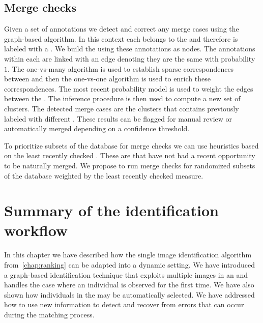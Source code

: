     \subsection{Merge checks}
        Given a set of annotations we detect and correct any merge cases using
          the graph-based algorithm.
        In this context each \annot{} belongs to the \masterdatabase{} and
          therefore is labeled with a \name{}.
        We build the \idengraph{} using these annotations as nodes.
        The annotations within each \name{} are linked with an edge denoting
          they are the same with probability $1$.
        The one-vs-many algorithm is used to establish sparse correspondences
          between \names{} and then the one-vs-one algorithm is used to enrich
          these correspondences.
        The most recent probability model is used to weight the edges between
          the \names{}.
        The inference procedure is then used to compute a new set of clusters.
        The detected merge cases are the clusters that contains \annots{}
          previously labeled with different \names{}.
        These results can be flagged for manual review or automatically merged
          depending on a confidence threshold.

        To prioritize subsets of the database for merge checks we can use
          heuristics based on the least recently checked \names{}.
        These are \names{} that have not had a recent opportunity to be
          naturally merged.
        We propose to run merge checks for randomized subsets of the database
          weighted by the least recently checked measure.

\section{Summary of the identification workflow}\label{sec:summary4}
    In this chapter we have described how the single image identification
      algorithm from~\cref{chap:ranking} can be adapted into a dynamic setting.
    We have introduced a graph-based identification technique that exploits
      multiple images in an \encounter{} and handles the case where an
      individual is observed for the first time.
    We have also shown how \exemplar{} individuals in the \masterdatabase{}
      may be automatically selected.
    We have addressed how to use new information to detect and recover from
      errors that can occur during the matching process.

